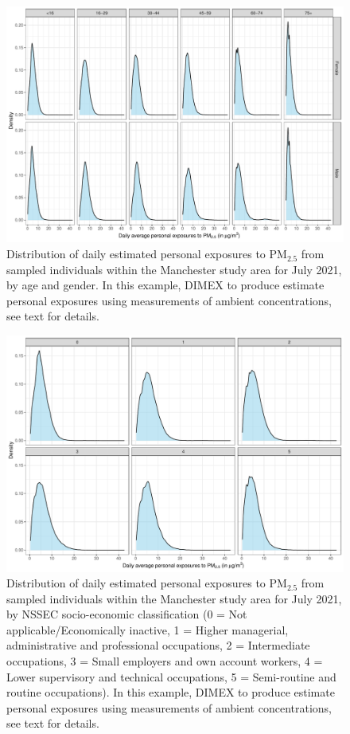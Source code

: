 \documentclass{article}
\begin{document}
\begin{figure}[!hbtp]
	\centering
	\includegraphics[width=0.72\linewidth]{Figures/Fig4a_AgeGr_Sex}		
	\caption{Distribution of daily estimated personal exposures to PM$_{2.5}$ from sampled individuals within the Manchester study area for July 2021, by age and gender. In this example, DIMEX to produce estimate personal exposures using measurements of ambient concentrations, see text for details. } \label{fig::Fig4a_AgeGr_Sex}
\end{figure}


\begin{figure}[!hbtp]
	\centering
	\includegraphics[width=0.72\linewidth]{Figures/Fig4a_nssec5}		
	\caption{Distribution of daily estimated personal exposures to PM$_{2.5}$ from sampled individuals within the Manchester study area for July 2021, by NSSEC socio-economic classification (0 = Not applicable/Economically inactive, 1 = Higher managerial, administrative and professional occupations, 2 = Intermediate occupations, 3 = Small employers and own account workers, 4 = Lower supervisory and technical occupations, 5 = Semi-routine and routine occupations). In this example, DIMEX to produce estimate personal exposures using measurements of ambient concentrations, see text for details. } \label{fig::Fig4a_nssec5}
\end{figure}
\end{document}
